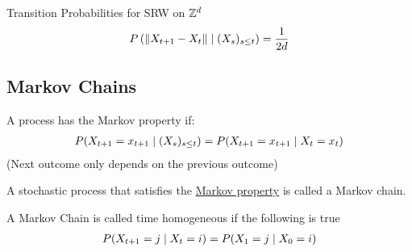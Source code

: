 \documentclass[12pt,a4paper]{article}
\begin{document}
\begin{example}{Transition Probabilities for SRW on $\mathbb{Z}^d$}
    \begin{align*}
        P\left(\norm{X_{t+1} - X_{t}} \;\vert\; (X_{s})_{s \leq t} \right) = \frac{1}{2d} 
    \end{align*}
\end{example}
\newpage
\subsection{Markov Chains}
\begin{defn}
    \label{markovprop}
    A process has the Markov property if:
    \begin{align*}
        P(X_{t+1}= x_{t+1} \;\vert\; (X_{s})_{s\leq t}) = P(X_{t+1} = x_{t+1} \;\vert\; X_{t} = x_t)
    \end{align*}
    (Next outcome only depends on the previous outcome)
\end{defn}

\begin{note}
    A stochastic process that satisfies the \hyperref[markovprop]{Markov property} is called a Markov chain.
\end{note}

\begin{defn}
    A Markov Chain is called time homogeneous if the following is true
    \begin{align*}
        P(X_{t+1} = j \;\vert\; X_t = i) = P(X_1 = j \;\vert\; X_0 = i)
    \end{align*}
\end{defn}
\end{document}
